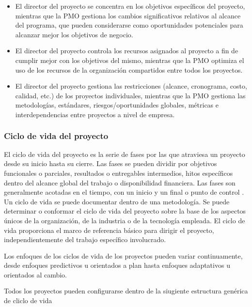 \begin{itemize}

\item{El director del proyecto se concentra en los objetivos específicos del proyecto, mientras que la PMO gestiona los cambios significativos relativos al alcance del programa, que pueden considerarse como oportunidades potenciales para alcanzar mejor los objetivos de negocio.}

\item{El  director  del  proyecto  controla  los  recursos  asignados  al  proyecto  a  fin  de  cumplir  mejor  con  los  objetivos  del  mismo,  mientras  que  la  PMO  optimiza  el  uso  de  los  recursos  de  la  organización  compartidos entre todos los proyectos.}

\item{El  director  del  proyecto  gestiona  las  restricciones  (alcance,  cronograma,  costo,  calidad,  etc.)  de  los  proyectos  individuales,  mientras  que  la  PMO  gestiona  las  metodologías,  estándares,  riesgos/oportunidades globales, métricas e interdependencias entre proyectos a nivel de empresa.}

\end{itemize}


\subsubsection{Ciclo de vida del proyecto}

El ciclo de vida del proyecto es la serie de fases por las que atraviesa un proyecto desde su inicio hasta su cierre. Las fases se pueden dividir por objetivos funcionales o parciales, resultados o entregables intermedios, hitos específicos dentro del alcance global del trabajo o disponibilidad financiera. Las fases son generalmente acotadas en el tiempo, con un inicio y un final o punto de control . Un ciclo de vida se puede documentar dentro de una metodología. Se puede determinar o conformar el ciclo de vida del proyecto sobre la base de los aspectos únicos de la organización, de la industria o de la tecnología empleada. El ciclo de vida proporciona el marco de referencia básico para dirigir el proyecto, independientemente del trabajo específico involucrado.

Los enfoques de los ciclos de vida de los proyectos pueden variar continuamente, desde enfoques predictivos u orientados a plan hasta enfoques adaptativos u orientados al cambio.

Todos los proyectos pueden configurarse dentro de la siugiente estructura genérica de cliclo de vida

